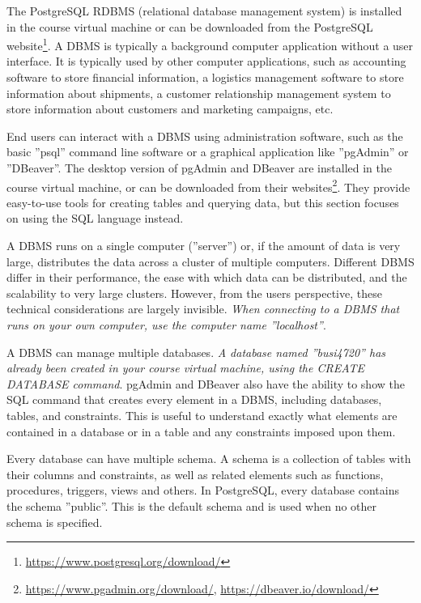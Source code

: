 The PostgreSQL RDBMS (relational database management system) is installed in the course virtual machine or can be downloaded from the PostgreSQL website\footnote{\url{https://www.postgresql.org/download/}}. A DBMS is typically a background computer application without a user interface. It is typically used by other computer applications, such as accounting software to store financial information, a logistics management software to store information about shipments, a customer relationship management system to store information about customers and marketing campaigns, etc. 

End users can interact with a DBMS using administration software, such as the basic ''psql'' command line software or a graphical application like ''pgAdmin'' or ''DBeaver''. The desktop version of pgAdmin and DBeaver are installed in the course virtual machine, or can be downloaded from their websites\footnote{\url{https://www.pgadmin.org/download/}, \url{https://dbeaver.io/download/}}. They provide easy-to-use tools for creating tables and querying data, but this section focuses on using the SQL language instead.

A DBMS runs on a single computer (''server'') or, if the amount of data is very large, distributes the data across a cluster of multiple computers. Different DBMS differ in their performance, the ease with which data can be distributed, and the scalability to very large clusters. However, from the users perspective, these technical considerations are largely invisible. \emph{When connecting to a DBMS that runs on your own computer, use the computer name ''localhost''}.

A DBMS can manage multiple databases. \emph{A database named ''busi4720'' has already been created in your course virtual machine, using the CREATE DATABASE command}. pgAdmin and DBeaver also have the ability to show the SQL command that creates every element in a DBMS, including databases, tables, and constraints. This is useful to understand exactly what elements are contained in a database or in a table and any constraints imposed upon them.

Every database can have multiple schema. A schema is a collection of tables with their columns and constraints, as well as related elements such as functions, procedures, triggers, views and others. In PostgreSQL, every database contains the schema ''public''. This is the default schema and is used when no other schema is specified. 

